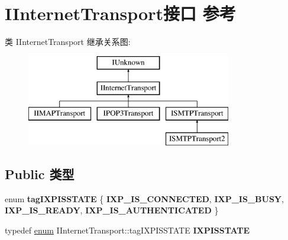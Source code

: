 \hypertarget{interface_i_internet_transport}{}\section{I\+Internet\+Transport接口 参考}
\label{interface_i_internet_transport}
类 I\+Internet\+Transport 继承关系图\+:\begin{figure}[H]
\begin{center}
\leavevmode
\includegraphics[height=4.000000cm]{interface_i_internet_transport}
\end{center}
\end{figure}
\subsection*{Public 类型}
\begin{DoxyCompactItemize}
\item 
\mbox{\label{interface_i_internet_transport_af97e3d6d9a4540b4995150eb6c4207a4}} 
enum {\bfseries tag\+I\+X\+P\+I\+S\+S\+T\+A\+TE} \{ {\bfseries I\+X\+P\+\_\+\+I\+S\+\_\+\+C\+O\+N\+N\+E\+C\+T\+ED}, 
{\bfseries I\+X\+P\+\_\+\+I\+S\+\_\+\+B\+U\+SY}, 
{\bfseries I\+X\+P\+\_\+\+I\+S\+\_\+\+R\+E\+A\+DY}, 
{\bfseries I\+X\+P\+\_\+\+I\+S\+\_\+\+A\+U\+T\+H\+E\+N\+T\+I\+C\+A\+T\+ED}
 \}
\item 
\mbox{\label{interface_i_internet_transport_ab1652478829d0ff34aa06db709094581}} 
typedef \hyperlink{interfaceenum}{enum} I\+Internet\+Transport\+::tag\+I\+X\+P\+I\+S\+S\+T\+A\+TE {\bfseries I\+X\+P\+I\+S\+S\+T\+A\+TE}
\end{DoxyCompactItemize}
